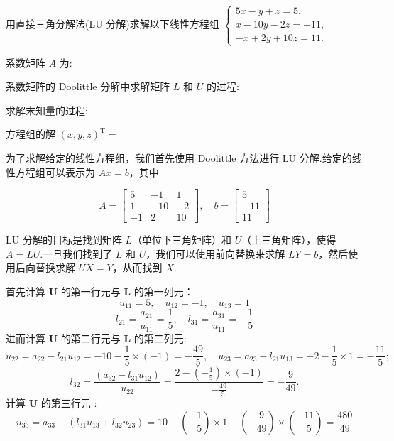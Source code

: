 \begin{tcolorbox}[breakable,enhanced,arc=0mm,outer arc=0mm,
		boxrule=0pt,toprule=1pt,leftrule=0pt,bottomrule=1pt, rightrule=0pt,left=0.2cm,right=0.2cm,
		titlerule=0.5em,toptitle=0.1cm,bottomtitle=-0.1cm,top=0.2cm,
		colframe=white!10!biru,colback=white!90!biru,coltitle=white,
            coltext=black,title =2024-04-02, title style={white!10!biru}, before skip=8pt, after skip=8pt,before upper=\hspace{2em},
		fonttitle=\bfseries,fontupper=\normalsize]
  
用直接三角分解法(LU 分解)求解以下线性方程组 $ \left\{\begin{array}{c}5 x-y+z=5, \\ x-10 y-2 z=-11, \\ -x+2 y+10 z=11 \text {. }\end{array}\right. $

系数矩阵 $ A $ 为:

系数矩阵的 Doolittle 分解中求解矩阵 $ L $ 和 $ U $ 的过程:

求解末知量的过程:

方程组的解 $ (x, y, z)^{\mathrm{T}}= $
 \tcblower

为了求解给定的线性方程组，我们首先使用 Doolittle 方法进行 LU 分解.给定的线性方程组可以表示为 $Ax = b$，其中

$$
A = \left[\begin{array}{ccc}
5 & -1 & 1 \\
1 & -10 & -2 \\
-1 & 2 & 10
\end{array}\right], \quad
b = \left[\begin{array}{c}
5 \\
-11 \\
11
\end{array}\right]
$$

LU 分解的目标是找到矩阵 $L$（单位下三角矩阵）和 $U$（上三角矩阵），使得 $A = LU$.一旦我们找到了 $L$ 和 $U$，我们可以使用前向替换来求解 $LY = b$，然后使用后向替换求解 $UX = Y$，从而找到 $X$.

    
首先计算 $ \boldsymbol{U} $ 的第一行元与 $ \boldsymbol{L} $ 的第一列元：
$$
u_{11}=5, \quad u_{12}=-1, \quad u_{13}=1 
$$
$$
l_{21}=\frac{a_{21} }{u_{11}}=\frac 15,  \quad l_{31}=\frac{a_{31} }{u_{11}}=-\frac 15
$$
进而计算 $ \boldsymbol{U} $ 的第二行元与 $ \boldsymbol{L} $ 的第二列元:
$$
u_{22}=a_{22}-l_{21} u_{12}=-10-\frac 15\times (-1)=-\frac{49}{5}, \quad u_{23}=a_{23}-l_{21} u_{13}=-2-\frac 15\times 1=-\frac{11}{5} ;
$$
$$
l_{32}=\frac{\left(a_{32}-l_{31} u_{12}\right)}{ u_{22}}=\frac{2-(-\frac 1 5)\times (-1)}{-\frac{49}{5}}=-\frac{9}{49} .
$$
 计算 $ \boldsymbol{U} $ 的第三行元 :
$$
u_{33}=a_{33}-\left(l_{31} u_{13}+l_{32} u_{23}\right)=10-(-\frac 15)\times 1-(-\frac{9}{49})\times(-\frac{11}{5})=\frac{480}{49}
$$


\end{tcolorbox}
